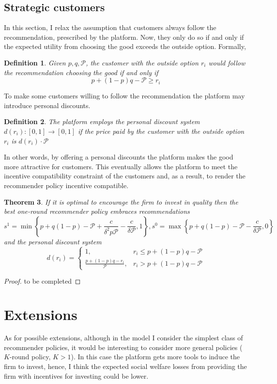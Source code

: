 \documentclass[a4paper]{article}
\newtheorem{theorem}{Theorem}
\newtheorem{definition}[theorem]{Definition}
\begin{document}
\subsection{Strategic customers}
In this section, I relax the assumption that customers always follow the recommendation, prescribed by the platform. Now, they only do so if and only if the expected utility from choosing the good exceeds the outside option. Formally, 
\begin{definition}
	Given $p, q, \mathcal{P}$, the customer with the outside option $r_i$ would follow the recommendation choosing the good if and only if $$p + (1-p)q - \mathcal{P} \ge r_i$$
\end{definition}

To make some customers willing to follow the recommendation the platform may introduce personal discounts.
\begin{definition}
	The platform employs the personal discount system $d(r_i): [0, 1] \to [0, 1]$ if the price paid by the customer with the outside option $r_i$ is $d(r_i) \cdot \mathcal{P}$
\end{definition}
In other words, by offering a personal discounts the platform makes the good more attractive for  customers. This eventually allows the platform to meet the incentive compatibility constraint of the customers and, as a result, to render the recommender policy incentive compatible.
\begin{theorem}
	If it is optimal to encourage the firm to invest in quality then the best one-round recommender policy embraces recommendations $$s^1 = \min \left\{ p + q(1-p) - \mathcal{P} + \frac{c}{\delta^2 p \mathcal{P}} - \frac{c}{\delta \mathcal{P}}, 1\right\}, s^0 = \max\left\{ p + q(1-p) - \mathcal{P} - \frac{c}{\delta \mathcal{P}}, 0\right\}$$ and the personal discount system $$d(r_i) = \begin{cases}
	1, &r_i \le p + (1-p)q - \mathcal{P}\\
	\frac{p+(1-p)q - r_i}{\mathcal{P}}, &r_i > p + (1-p)q - \mathcal{P}
	\end{cases}$$
\end{theorem}
\begin{proof}
	to be completed
\end{proof}
\section{Extensions}
As for possible extensions, although in the model I consider the simplest class of recommender policies, it would be interesting to consider more general policies ($K$-round policy, $K > 1$). In this case the platform gets more tools to induce the firm to invest, hence, I think the expected social welfare losses from providing the firm with incentives for investing could be lower.
\end{document}
